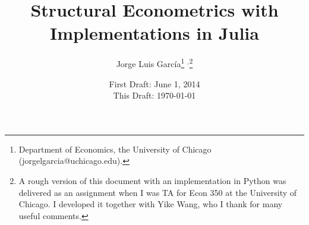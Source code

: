 



\title{\textbf{Structural Econometrics with Implementations in Julia}}
\author{Jorge Luis Garc\'{i}a\thanks{Department of Economics, the University of Chicago (jorgelgarcia@uchicago.edu).} $^{,}$\thanks{A rough version of this document with an implementation in Python was delivered as an assignment when I was TA for Econ 350 at the University of Chicago. I developed it together with Yike Wang, who I thank for many useful comments.}}
\date{First Draft: June 1, 2014 \\ This Draft: \today}
\maketitle

\setcounter{section}{1}

